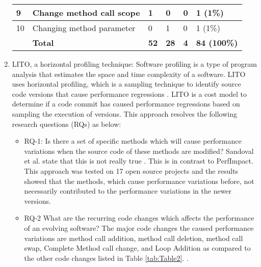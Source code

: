\documentclass[article,type=msc,colorback,12pt,accentcolor=tud8b,table]{tudthesis}
\begin{document}
\begin{enumerate}
\begin{table}[]
\begin{tabular}{|l|l|l|l|l|l|}
		9  & Change method call scope                             & 1                                  & 0                                  & 0                                    & 1 (1\%)                                \\ \hline
		10 & Changing method parameter                            & 0                                  & 1                                  & 0                                    & 1 (1\%)                                \\ \hline
		& \textbf{Total}                                       & \textbf{52}                        & \textbf{28}                        & \textbf{4}                           & \textbf{84 (100\%)}                    \\ \hline
	\end{tabular}
\end{table}

\item{LITO, a horizontal profiling technique:} 
Software profiling is a type of program analysis that estimates the space and time complexity of a software. LITO uses horizontal profiling, which is a sampling technique to identify source code versions that cause performance regressions \cite{sandoval2016learning}. LITO is a cost model to determine if a code commit has caused performance regressions based on sampling the execution of versions. This approach resolves the following research questions (RQs) as below:

\begin{itemize}

\item RQ-1: Is there a set of specific methods which will cause performance variations when the source code of these methods are modified? Sandoval et al. state that this is not really true \cite{sandoval2016learning}. This is in contrast to PerfImpact. This approach was tested on 17 open source projects and the results showed that the methods, which cause performance variations before, not necessarily contributed to the performance variations in the newer versions.

\item RQ-2  What are the recurring code changes which affects the performance of an evolving software? The major code changes the caused performance variations are method call addition, method call deletion, method call swap, Complete Method call change, and Loop Addition  as compared to the other code changes listed in Table \ref{tab:Table2}. \cite{sandoval2016learning}.

\end{itemize}
\end{enumerate}	
\end{document}
